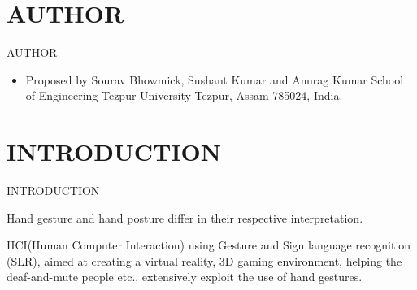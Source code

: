 \documentclass{beamer}
\begin{document}
\section{AUTHOR}
\begin{frame}{AUTHOR}
\begin{itemize}
\item Proposed by Sourav Bhowmick, Sushant Kumar and Anurag Kumar
School of Engineering
Tezpur University
Tezpur, Assam-785024, India.

\end{itemize}
\end{frame}
\section{INTRODUCTION}
\begin{frame}{INTRODUCTION}
\begin{block}{}
Hand gesture and hand posture differ in their
respective interpretation.
\end{block}

\vspace{.5 cm}
\begin{block}{}


 HCI(Human Computer Interaction) using Gesture and Sign language recognition (SLR), aimed at creating a virtual reality, 3D gaming environment, helping the deaf-and-mute people etc.,
extensively exploit the use of hand gestures.
\end{block}


\end{frame}
\end{document}
